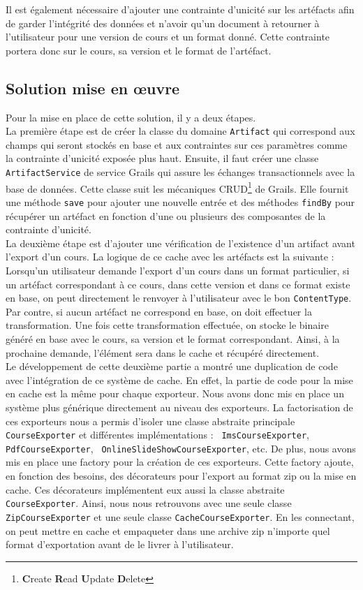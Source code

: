 Il est également nécessaire d'ajouter une contrainte d'unicité sur les artéfacts
afin de garder l'intégrité des données et n'avoir qu'un document à retourner à
l'utilisateur pour une version de cours et un format donné. Cette contrainte
portera donc sur le cours, sa version et le format de l'artéfact.

\subsection{Solution mise en \oe uvre}
Pour la mise en place de cette solution, il y a deux étapes.\\

La première étape est de créer la classe du domaine {\tt Artifact} qui
correspond aux champs qui seront stockés en base et aux contraintes sur ces
paramètres comme la contrainte d'unicité exposée plus haut. Ensuite, il faut
créer
une classe {\tt ArtifactService} de service Grails qui assure les échanges
transactionnels avec la base de données. Cette classe suit les mécaniques
CRUD\footnote{{\bf C}reate {\bf R}ead {\bf U}pdate {\bf D}elete} de
Grails. Elle fournit une méthode {\tt save} pour ajouter une nouvelle entrée et
des méthodes {\tt findBy} pour récupérer un artéfact en fonction d'une ou
plusieurs des composantes de la contrainte d'unicité.\\

La deuxième étape est d'ajouter une vérification de l'existence d'un artifact
avant l'export d'un cours. La logique de ce cache avec les artéfacts est la
suivante : Lorsqu'un utilisateur demande l'export d'un cours dans un format
particulier, si un artéfact correspondant à ce cours, dans cette version et dans
ce format existe en base, on peut directement le renvoyer à l'utilisateur avec
le bon {\tt ContentType}. Par contre, si aucun artéfact ne correspond en base,
on doit effectuer la transformation. Une fois cette transformation effectuée, on
stocke le binaire généré en base avec le cours, sa version et le format
correspondant. Ainsi, à la prochaine demande, l'élément sera dans le \og cache
\fg{} et récupéré directement.\\

Le développement de cette deuxième partie a montré une duplication de code avec
l'intégration de ce système de cache. En effet, la partie de code pour la mise
en cache est la même pour chaque
exporteur. Nous avons donc mis en place un système plus générique directement au niveau des
exporteurs. La factorisation de ces exporteurs nous a permis d'isoler une classe
abstraite principale {\tt CourseExporter} et différentes implémentations : {\tt
ImsCourseExporter}, {\tt PdfCourseExporter}, {\tt
OnlineSlideShowCourseExporter}, etc. De plus, nous avons mis en place une \og
factory \fg{} pour la création de ces exporteurs. Cette factory ajoute, en
fonction des besoins, des décorateurs pour l'export au format zip ou la mise en
cache. Ces décorateurs implémentent eux aussi la classe abstraite {\tt
CourseExporter}. Ainsi, nous nous retrouvons avec une seule classe {\tt
ZipCourseExporter} et une seule classe {\tt CacheCourseExporter}. En les
connectant, on peut mettre en cache et empaqueter dans une archive zip
n'importe quel format d'exportation avant de le livrer à l'utilisateur.

